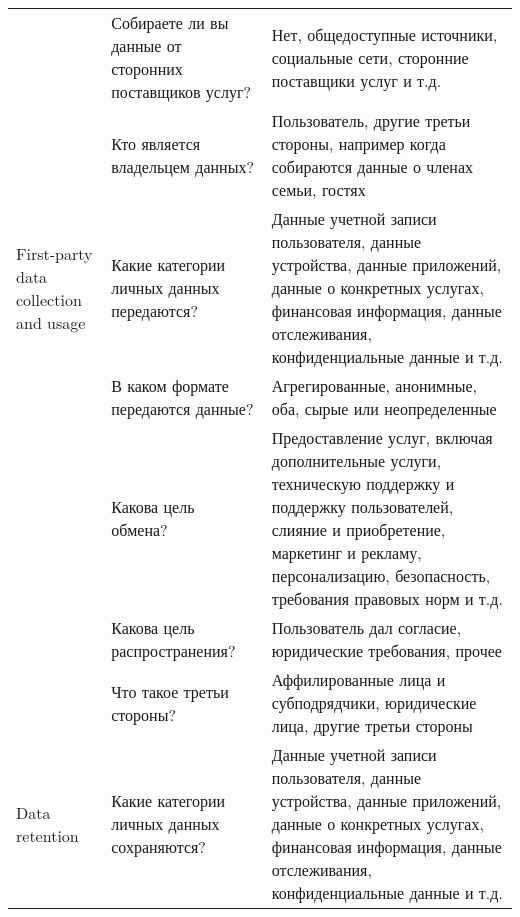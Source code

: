 \documentclass[../main]{subfiles}
\begin{document}
\begin{ltwrap}{2mm}{1.7}{\footnotesize}
\begin{longtable}[H]{|M{.20\x}|M{.30\x}|M{.50\x}|}

        & Собираете ли вы данные от сторонних поставщиков услуг?
        & Нет, общедоступные источники, социальные сети, сторонние поставщики услуг и т.д.\\
        

        & Кто является владельцем данных?
        & Пользователь, другие третьи стороны, например когда собираются данные о членах семьи, гостях\\

        \hline

        First-party data collection and usage
        & Какие категории личных данных передаются?
        & Данные учетной записи пользователя, данные устройства, данные приложений, данные о конкретных услугах, финансовая информация, данные отслеживания, конфиденциальные данные и т.д.\\
        

        & В каком формате передаются данные?
        & Агрегированные, анонимные, оба, сырые или неопределенные\\
        

        & Какова цель обмена?
        & Предоставление услуг, включая дополнительные услуги, техническую поддержку и поддержку пользователей, слияние и приобретение, маркетинг и рекламу, персонализацию, безопасность, требования правовых норм и т.д. \\
        

        & Какова цель распространения?
        & Пользователь дал согласие, юридические требования, прочее\\
        
        \hline

        & Что такое третьи стороны?
        & Аффилированные лица и субподрядчики, юридические лица, другие третьи стороны\\

        \hline

        Data retention
        & Какие категории личных данных сохраняются? 
        & Данные учетной записи пользователя, данные устройства, данные приложений, данные о конкретных услугах, финансовая информация, данные отслеживания, конфиденциальные данные и т.д.\\


\end{longtable}
\end{ltwrap}
\end{document}
